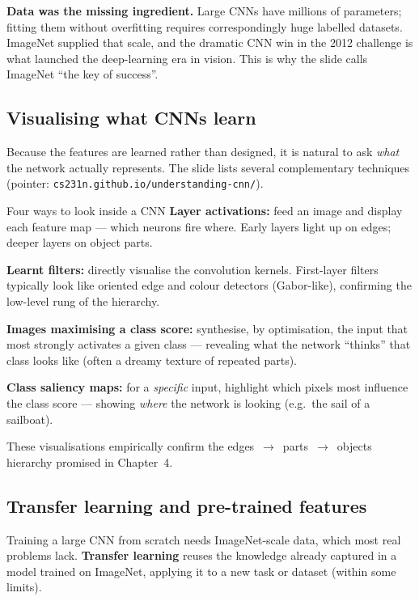 \documentclass{report}
\begin{document}
\begin{keybox}
\textbf{Data was the missing ingredient.} Large CNNs have millions of
parameters; fitting them without overfitting requires correspondingly huge
labelled datasets. ImageNet supplied that scale, and the dramatic CNN win in the
2012 challenge is what launched the deep-learning era in vision. This is why the
slide calls ImageNet ``the key of success''.
\end{keybox}

\subsection{Visualising what CNNs learn}

Because the features are learned rather than designed, it is natural to ask
\emph{what} the network actually represents. The slide lists several
complementary techniques (pointer: \texttt{cs231n.github.io/understanding-cnn/}).

\begin{defbox}{Four ways to look inside a CNN}
\textbf{Layer activations:} feed an image and display each feature map --- which
neurons fire where. Early layers light up on edges; deeper layers on
object parts.

\medskip
\textbf{Learnt filters:} directly visualise the convolution kernels. First-layer
filters typically look like oriented edge and colour detectors (Gabor-like),
confirming the low-level rung of the hierarchy.

\medskip
\textbf{Images maximising a class score:} synthesise, by optimisation, the input
that most strongly activates a given class --- revealing what the network
``thinks'' that class looks like (often a dreamy texture of repeated parts).

\medskip
\textbf{Class saliency maps:} for a \emph{specific} input, highlight which
pixels most influence the class score --- showing \emph{where} the network is
looking (e.g.\ the sail of a sailboat).
\end{defbox}

These visualisations empirically confirm the
edges~$\to$~parts~$\to$~objects hierarchy promised in Chapter~4.

\subsection{Transfer learning and pre-trained features}

Training a large CNN from scratch needs ImageNet-scale data, which most real
problems lack. \textbf{Transfer learning} reuses the knowledge already captured
in a model trained on ImageNet, applying it to a new task or dataset (within
some limits).
\end{document}
